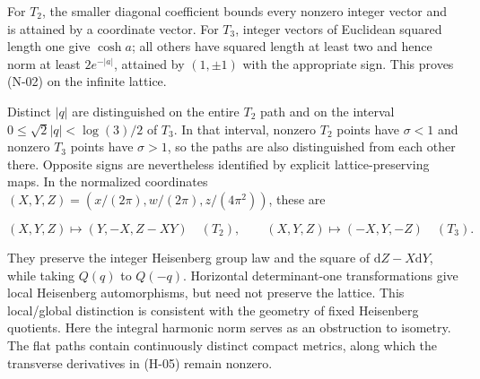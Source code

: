 For $T_2$, the smaller diagonal coefficient bounds every nonzero integer
vector and is attained by a coordinate vector. For $T_3$, integer vectors of
Euclidean squared length one give $\cosh a$; all others have squared length
at least two and hence norm at least $2e^{-|a|}$, attained by $(1,\pm1)$
with the appropriate sign. This proves (N-02) on the infinite lattice.

Distinct $|q|$ are distinguished on the entire $T_2$ path and on the interval
$0\le\sqrt2|q|<\log(3)/2$ of $T_3$. In that interval, nonzero $T_2$ points
have $\sigma<1$ and nonzero $T_3$ points have $\sigma>1$, so the paths are
also distinguished from each other there. Opposite signs are nevertheless
identified by explicit lattice-preserving maps. In the normalized coordinates
$(X,Y,Z)=(x/(2\pi),w/(2\pi),z/(4\pi^2))$, these are

\begin{equation}\tag{N-03}\label{eq:N-03}
(X,Y,Z)\mapsto(Y,-X,Z-XY)\quad(T_2),\qquad
(X,Y,Z)\mapsto(-X,Y,-Z)\quad(T_3).
\end{equation}

They preserve the integer Heisenberg group law and the square of
$\mathrm{d}Z-X\mathrm{d}Y$, while taking $Q(q)$ to $Q(-q)$.
Horizontal determinant-one transformations give local Heisenberg
automorphisms, but need not preserve the lattice. This local/global distinction
is consistent with the geometry of fixed Heisenberg quotients\cite{Boldt2021}.
Here the integral harmonic norm serves as an obstruction to isometry.
The flat paths contain continuously distinct compact metrics, along which
the transverse derivatives in (H-05) remain nonzero.
